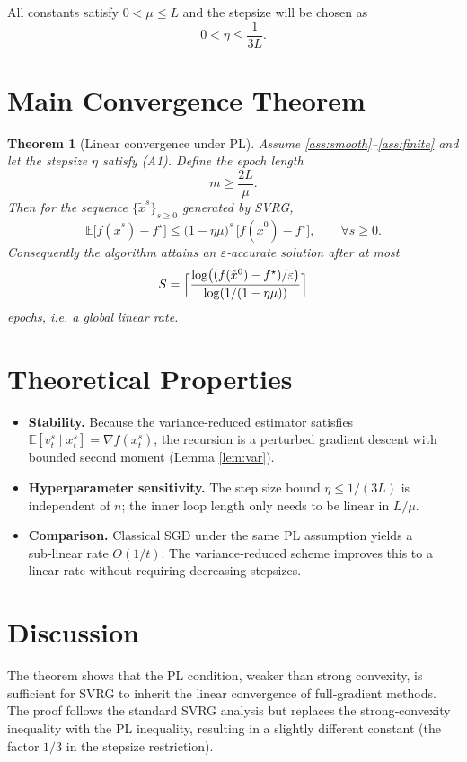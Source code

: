 \documentclass{article}
\newtheorem{theorem}{Theorem}[section]
\begin{document}
All constants satisfy $0<\mu\le L$ and the stepsize will be chosen as
\[
0<\eta\le \frac{1}{3L}. \tag{A1}
\]

\section*{Main Convergence Theorem}
\begin{theorem}[Linear convergence under PL]\label{thm:linear}
Assume \ref{ass:smooth}–\ref{ass:finite} and let the stepsize $\eta$ satisfy (A1).  
Define the epoch length
\[
m\ge \frac{2L}{\mu}. \tag{A2}
\]
Then for the sequence $\{\tilde{x}^{s}\}_{s\ge0}$ generated by SVRG,
\[
\mathbb{E}\!\bigl[f(\tilde{x}^{s})-f^{\star}\bigr]\le
\bigl(1-\eta\mu\bigr)^{s}\,\bigl[f(\tilde{x}^{0})-f^{\star}\bigr],
\qquad\forall s\ge0 .
\]
Consequently the algorithm attains an $\varepsilon$‑accurate solution after at most
\[
S = \Bigl\lceil\frac{\log\bigl((f(\tilde{x}^{0})-f^{\star})/\varepsilon\bigr)}{\log(1/(1-\eta\mu))}\Bigr\rceil
\]
epochs, i.e. a \emph{global linear rate}.
\end{theorem}

\section*{Theoretical Properties}
\begin{itemize}
    \item \textbf{Stability.} Because the variance‑reduced estimator satisfies
          $\mathbb{E}[v_t^{s}\mid x_t^{s}]=\nabla f(x_t^{s})$, the recursion is a
          perturbed gradient descent with bounded second moment (Lemma \ref{lem:var}).
    \item \textbf{Hyperparameter sensitivity.} The step size bound $\eta\le1/(3L)$
          is independent of $n$; the inner loop length only needs to be linear in $L/\mu$.
    \item \textbf{Comparison.} Classical SGD under the same PL assumption yields a
          sub‑linear rate $O(1/t)$. The variance‑reduced scheme improves this to a
          linear rate without requiring decreasing stepsizes.
\end{itemize}

\section*{Discussion}
The theorem shows that the PL condition, weaker than strong convexity,
is sufficient for SVRG to inherit the linear convergence of full‑gradient
methods. The proof follows the standard SVRG analysis but replaces the
strong‑convexity inequality with the PL inequality, resulting in a slightly
different constant (the factor $1/3$ in the stepsize restriction).
\end{document}
